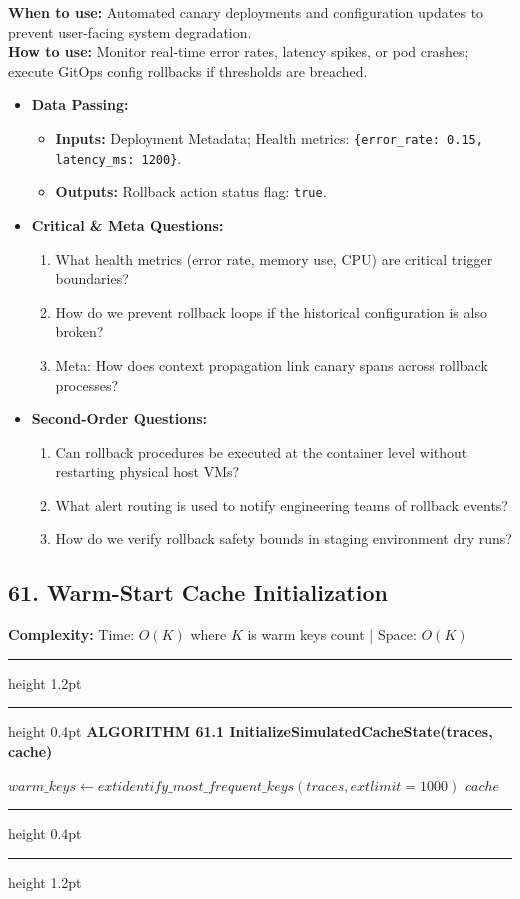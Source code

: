 \documentclass[11pt,a4paper]{article}
\newenvironment{textbookalgo}[2]{%
  \par\addvspace{1.2em}\noindent
  \hrule height 1.2pt
  \vspace{1.5pt}
  \hrule height 0.4pt
  \vspace{5pt}
  {\noindent\large\bfseries\sffamily ALGORITHM #1 \quad #2}
  \par\vspace{5pt}
  \RestyleAlgo{plain}
}{%
  \par\vspace{4pt}
  \hrule height 0.4pt
  \vspace{1.5pt}
  \hrule height 1.2pt
  \par\addvspace{1.2em}
}
\theoremstyle{definition}
\begin{document}
\noindent
\textbf{When to use:} Automated canary deployments and configuration updates to prevent user-facing system degradation.\\
\textbf{How to use:} Monitor real-time error rates, latency spikes, or pod crashes; execute GitOps config rollbacks if thresholds are breached.
\begin{itemize}[leftmargin=*]
  \item[] \textbf{Data Passing:}
    \begin{itemize}
      \item \textbf{Inputs:} Deployment Metadata; Health metrics: \texttt{\{error\_rate: 0.15, latency\_ms: 1200\}}.
      \item \textbf{Outputs:} Rollback action status flag: \texttt{true}.
    \end{itemize}
  \item[] \textbf{Critical \& Meta Questions:}
  \begin{enumerate}
    \item What health metrics (error rate, memory use, CPU) are critical trigger boundaries?
    \item How do we prevent rollback loops if the historical configuration is also broken?
    \item Meta: How does context propagation link canary spans across rollback processes?
  \end{enumerate}
  \item[] \textbf{Second-Order Questions:}
  \begin{enumerate}
    \item Can rollback procedures be executed at the container level without restarting physical host VMs?
    \item What alert routing is used to notify engineering teams of rollback events?
    \item How do we verify rollback safety bounds in staging environment dry runs?
  \end{enumerate}
\end{itemize}
\medskip

\clearpage
\subsection{61. Warm-Start Cache Initialization}


\noindent
\textbf{Complexity:} Time: $O(K)$ where $K$ is warm keys count | Space: $O(K)$
\smallskip

\begin{textbookalgo}{61.1}{InitializeSimulatedCacheState(traces, cache)}
\begin{algorithm}[H]
$warm\_keys \leftarrow 	ext{identify\_most\_frequent\_keys}(traces, 	ext{limit}=1000)$\;
\Return $cache$\;
\end{algorithm}
\end{textbookalgo}
\end{document}
